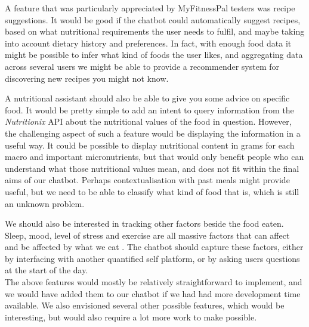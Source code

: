 A feature that was particularly appreciated by MyFitnessPal testers was recipe suggestions. It would be good if the chatbot could automatically suggest recipes, based on what nutritional requirements the user needs to fulfil, and maybe taking into account dietary history and preferences. In fact, with enough food data it might be possible to infer what kind of foods the user likes, and aggregating data across several users we might be able to provide a recommender system for discovering new recipes you might not know. 

A nutritional assistant should also be able to give you some advice on specific food. It would be pretty simple to add an intent to query information from the \textit{Nutritionix} API about the nutritional values of the food in question. However, the challenging aspect of such a feature would be displaying the information in a useful way. It could be possible to display nutritional content in grams for each macro and important micronutrients, but that would only benefit people who can understand what those nutritional values mean, and does not fit within the final aims of our chatbot. Perhaps contextualisation with past meals might provide useful, but we need to be able to classify what kind of food that is, which is still an unknown problem.

We should also be interested in tracking other factors beside the food eaten. Sleep, mood, level of stress and exercise are all massive factors that can affect and be affected by what we eat \cite{buman2015physical}. The chatbot should capture these factors, either by interfacing with another quantified self platform, or by asking users questions at the start of the day. \\
The above features would mostly be relatively straightforward to implement, and we would have added them to our chatbot if we had had more development time available. We also envisioned several other possible features, which would be interesting, but would also require a lot more work to make possible.

